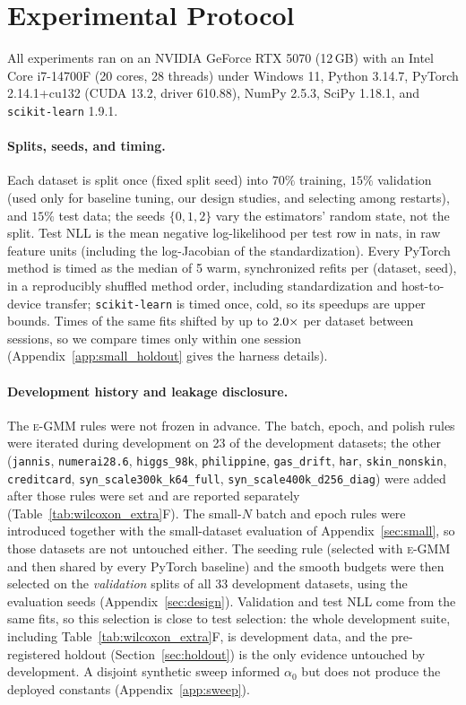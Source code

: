 \documentclass[10pt]{article} %
\newcommand{\egmm}{\textsc{e-GMM}}
\begin{document}
\section{Experimental Protocol}
\label{sec:protocol}

All experiments ran on an NVIDIA GeForce RTX 5070 (12\,GB) with an Intel Core i7-14700F (20 cores, 28 threads) under Windows 11, Python 3.14.7, PyTorch 2.14.1+cu132 (CUDA 13.2, driver 610.88), NumPy 2.5.3, SciPy 1.18.1, and \texttt{scikit-learn} 1.9.1.

\paragraph{Splits, seeds, and timing.} Each dataset is split once (fixed split seed) into $70\%$ training, $15\%$ validation (used only for baseline tuning, our design studies, and selecting among restarts), and $15\%$ test data; the \rnSeeds{} seeds $\{0,1,2\}$ vary the estimators' random state, not the split. Test NLL is the mean negative log-likelihood per test row in nats, in raw feature units (including the log-Jacobian of the standardization). Every PyTorch method is timed as the median of 5 warm, synchronized refits per (dataset, seed), in a reproducibly shuffled method order, including standardization and host-to-device transfer; \texttt{scikit-learn} is timed once, cold, so its speedups are upper bounds. Times of the same fits shifted by up to $2.0\times$ per dataset between sessions, so we compare times only within one session (Appendix~\ref{app:small_holdout} gives the harness details).

\paragraph{Development history and leakage disclosure.} The \egmm{} rules were not frozen in advance. The batch, epoch, and polish rules were iterated during development on 23 of the \rnDatasets{} development datasets; the other \rnHeld{} (\texttt{jannis}, \texttt{numerai28.6}, \texttt{higgs\_98k}, \texttt{philippine}, \texttt{gas\_drift}, \texttt{har}, \texttt{skin\_nonskin}, \texttt{creditcard}, \texttt{syn\_scale300k\_k64\_full}, \texttt{syn\_scale400k\_d256\_diag}) were added after those rules were set and are reported separately (Table~\ref{tab:wilcoxon_extra}F). The small-$N$ batch and epoch rules were introduced together with the small-dataset evaluation of Appendix~\ref{sec:small}, so those datasets are not untouched either. The seeding rule (selected with \egmm{} and then shared by every PyTorch baseline) and the smooth budgets were then selected on the \emph{validation} splits of all 33 development datasets, using the evaluation seeds (Appendix~\ref{sec:design}). Validation and test NLL come from the same fits, so this selection is close to test selection: the whole development suite, including Table~\ref{tab:wilcoxon_extra}F, is development data, and the pre-registered holdout (Section~\ref{sec:holdout}) is the only evidence untouched by development. A disjoint synthetic sweep informed $\alpha_0$ but does not produce the deployed constants (Appendix~\ref{app:sweep}).
\end{document}
